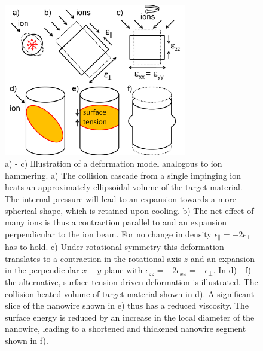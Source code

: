 \begin{figure}[thbp]
	\centering
		\includegraphics[width=8cm]{images/deformationmodel.jpg}
	\caption{a) - c) Illustration of a deformation model analogous to ion hammering. a) The collision cascade from a single impinging ion heats an approximately ellipsoidal volume of the target material. The internal pressure will lead to an expansion towards a more spherical shape, which is retained upon cooling. b) The net effect of many ions is thus a contraction parallel to and an expansion perpendicular to the ion beam. For no change in density $\epsilon_\parallel = -2\epsilon_\perp$ has to hold. c) Under rotational symmetry this deformation translates to a contraction in the rotational axis $z$ and an expansion in the perpendicular $x-y$ plane with $\epsilon_{zz} = -2\epsilon_{xx} = -\epsilon_\perp$. In d) - f) the alternative, surface tension driven deformation is illustrated. The collision-heated volume of target material shown in d). A significant slice of the nanowire shown in e) thus has a reduced viscosity. The surface energy is reduced by an increase in the local diameter of the nanowire, leading to a shortened and thickened nanowire segment shown in f).} 
	\label{deformationmodel}
\end{figure}

